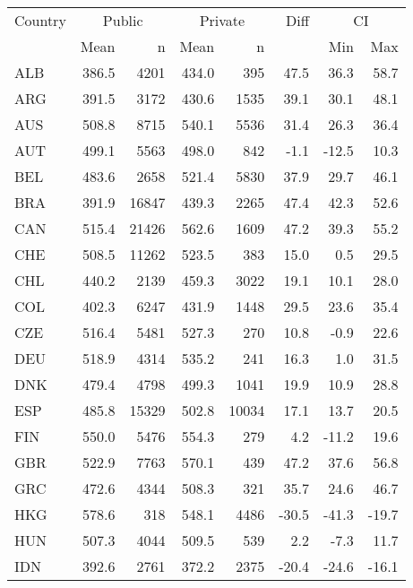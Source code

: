 \begin{table}[ht]
\begin{center}
{\smaller
\begin{tabular}{lrr@{\extracolsep{10pt}}rr@{\extracolsep{10pt}}rrr}
  \hline
  Country & \multicolumn{2}{c}{Public} & \multicolumn{2}{c}{Private} & Diff & \multicolumn{2}{c}{CI} \\ \cline{2-3} \cline{4-5} \cline{7-8} & Mean & n & Mean & n & & Min & Max \\ \hline
ALB & 386.5 & 4201 & 434.0 & 395 & 47.5 & 36.3 & 58.7 \\ 
  ARG & 391.5 & 3172 & 430.6 & 1535 & 39.1 & 30.1 & 48.1 \\ 
  AUS & 508.8 & 8715 & 540.1 & 5536 & 31.4 & 26.3 & 36.4 \\ 
  AUT & 499.1 & 5563 & 498.0 & 842 & -1.1 & -12.5 & 10.3 \\ 
  BEL & 483.6 & 2658 & 521.4 & 5830 & 37.9 & 29.7 & 46.1 \\ 
  BRA & 391.9 & 16847 & 439.3 & 2265 & 47.4 & 42.3 & 52.6 \\ 
  CAN & 515.4 & 21426 & 562.6 & 1609 & 47.2 & 39.3 & 55.2 \\ 
  CHE & 508.5 & 11262 & 523.5 & 383 & 15.0 & 0.5 & 29.5 \\ 
  CHL & 440.2 & 2139 & 459.3 & 3022 & 19.1 & 10.1 & 28.0 \\ 
  COL & 402.3 & 6247 & 431.9 & 1448 & 29.5 & 23.6 & 35.4 \\ 
  CZE & 516.4 & 5481 & 527.3 & 270 & 10.8 & -0.9 & 22.6 \\ 
  DEU & 518.9 & 4314 & 535.2 & 241 & 16.3 & 1.0 & 31.5 \\ 
  DNK & 479.4 & 4798 & 499.3 & 1041 & 19.9 & 10.9 & 28.8 \\ 
  ESP & 485.8 & 15329 & 502.8 & 10034 & 17.1 & 13.7 & 20.5 \\ 
  FIN & 550.0 & 5476 & 554.3 & 279 & 4.2 & -11.2 & 19.6 \\ 
  GBR & 522.9 & 7763 & 570.1 & 439 & 47.2 & 37.6 & 56.8 \\ 
  GRC & 472.6 & 4344 & 508.3 & 321 & 35.7 & 24.6 & 46.7 \\ 
  HKG & 578.6 & 318 & 548.1 & 4486 & -30.5 & -41.3 & -19.7 \\ 
  HUN & 507.3 & 4044 & 509.5 & 539 & 2.2 & -7.3 & 11.7 \\ 
  IDN & 392.6 & 2761 & 372.2 & 2375 & -20.4 & -24.6 & -16.1 \\ 

\end{tabular}}
\end{center}
\end{table}
